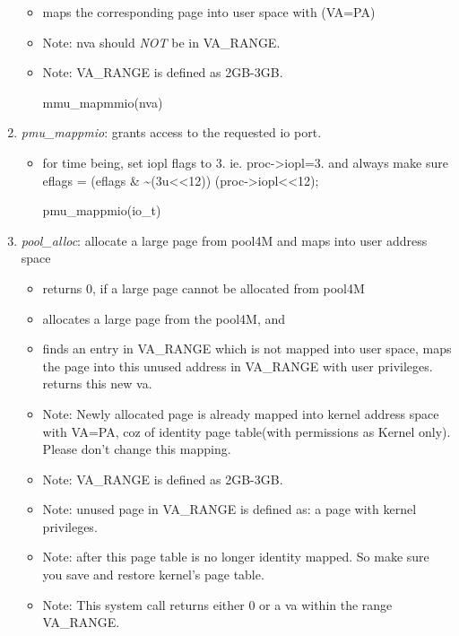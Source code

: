 \documentclass[]{book}
\newenvironment{Shaded}{}{}
\newcommand{\NormalTok}[1]{{#1}}
\begin{document}
\begin{enumerate}
  \begin{itemize}
  \item
    maps the corresponding page into user space with (VA=PA)
  \item
    Note: nva should \emph{NOT} be in VA\_RANGE.
  \item
    Note: VA\_RANGE is defined as 2GB-3GB.

\begin{Shaded}
\begin{Highlighting}[]
\NormalTok{mmu_mapmmio(nva)}
\end{Highlighting}
\end{Shaded}
  \end{itemize}
\item
  \emph{pmu\_mappmio}: grants access to the requested io port.

  \begin{itemize}
  \item
    for time being, set iopl flags to 3. ie. proc-\textgreater{}iopl=3.
    and always make sure eflags = (eflags \&
    \textasciitilde{}(3u\textless{}\textless{}12)) \textbar{}
    (proc-\textgreater{}iopl\textless{}\textless{}12);

\begin{Shaded}
\begin{Highlighting}[]
\NormalTok{pmu_mappmio(io_t)}
\end{Highlighting}
\end{Shaded}
  \end{itemize}
\item
  \emph{pool\_alloc}: allocate a large page from pool4M and maps into
  user address space

  \begin{itemize}
  \item
    returns 0, if a large page cannot be allocated from pool4M
  \item
    allocates a large page from the pool4M, and
  \item
    finds an entry in VA\_RANGE which is not mapped into user space,
    maps the page into this unused address in VA\_RANGE with user
    privileges. returns this new va.
  \item
    Note: Newly allocated page is already mapped into kernel address
    space with VA=PA, coz of identity page table(with permissions as
    Kernel only). Please don't change this mapping.
  \item
    Note: VA\_RANGE is defined as 2GB-3GB.
  \item
    Note: unused page in VA\_RANGE is defined as: a page with kernel
    privileges.
  \item
    Note: after this page table is no longer identity mapped. So make
    sure you save and restore kernel's page table.
  \item
    Note: This system call returns either 0 or a va within the range
    VA\_RANGE.


\end{itemize}
\end{enumerate}
\end{document}
